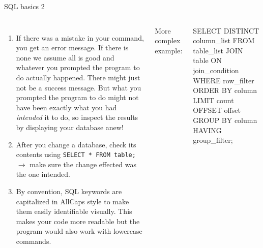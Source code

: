 \begin{frame}[fragile]{SQL basics 2}
\begin{columns}
  \begin{enumerate}\footnotesize
      \item If there was a mistake in your command, you get an error message. If there is none we assume all is good and whatever you prompted the program to do actually happened. There might just not be a success message. But what you prompted the program to do might not have been exactly what you had \emph{intended} it to do, so inspect the results by displaying your database anew!
      \item After you change a database, check its contents using  \texttt{SELECT * FROM table;} $\to$ make sure the change effected was the one intended.
      \item By convention, SQL keywords are capitalized in AllCaps style to make them easily identifiable visually. This makes your code more readable but the program would also work with lowercase commands.
  \end{enumerate}
More complex example:
  \begin{sqlcode}
SELECT DISTINCT column_list
FROM table_list
JOIN table ON join_condition
WHERE row_filter
ORDER BY column
LIMIT count OFFSET offset
GROUP BY column
HAVING group_filter;
\end{sqlcode}
\end{columns}
\end{frame}



